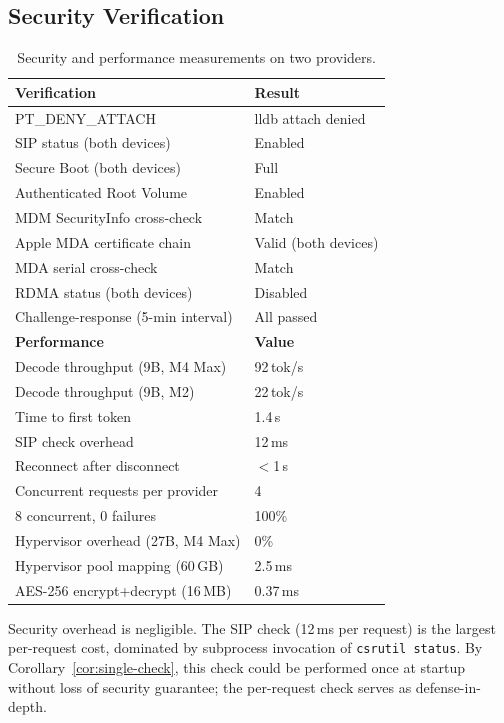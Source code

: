 \documentclass[10pt,twocolumn,letterpaper]{article}
\begin{document}
\subsection{Security Verification}

\begin{table}[h]
\centering
\caption{Security and performance measurements on two providers.}
\vspace{4pt}
\small
\begin{tabular}{@{}ll@{}}
\toprule
\textbf{Verification} & \textbf{Result} \\
\midrule
PT\_DENY\_ATTACH & lldb attach denied \\
SIP status (both devices) & Enabled \\
Secure Boot (both devices) & Full \\
Authenticated Root Volume & Enabled \\
MDM SecurityInfo cross-check & Match \\
Apple MDA certificate chain & Valid (both devices) \\
MDA serial cross-check & Match \\
RDMA status (both devices) & Disabled \\
Challenge-response (5-min interval) & All passed \\
\midrule
\textbf{Performance} & \textbf{Value} \\
\midrule
Decode throughput (9B, M4 Max) & 92\,tok/s \\
Decode throughput (9B, M2) & 22\,tok/s \\
Time to first token & 1.4\,s \\
SIP check overhead & 12\,ms \\
Reconnect after disconnect & $<$1\,s \\
Concurrent requests per provider & 4 \\
8 concurrent, 0 failures & 100\% \\
Hypervisor overhead (27B, M4 Max) & 0\% \\
Hypervisor pool mapping (60\,GB) & 2.5\,ms \\
AES-256 encrypt+decrypt (16\,MB) & 0.37\,ms \\
\bottomrule
\end{tabular}
\end{table}

Security overhead is negligible. The SIP check (12\,ms per request) is the largest per-request cost, dominated by subprocess invocation of \texttt{csrutil status}. By Corollary~\ref{cor:single-check}, this check could be performed once at startup without loss of security guarantee; the per-request check serves as defense-in-depth.
\end{document}
